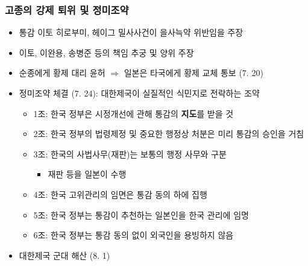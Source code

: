 \subsubsection*{고종의 강제 퇴위 및 정미조약}

\begin{itemize}
    \item 통감 이토 히로부미, 헤이그 밀사사건이 을사늑약 위반임을 주장
    \item 이토, 이완용, 송병준 등의 책임 추궁 및 양위 주장
    \item 순종에게 황제 대리 윤허 $\Rightarrow$ 일본은 타국에게 황제 교체 통보 (7. 20)
    \item 정미조약 체결 (7. 24): 대한제국이 실질적인 식민지로 전락하는 조약
    \begin{itemize}
        \item 1조: 한국 정부은 시정개선에 관해 통감의 \textbf{지도}를 받을 것
        \item 2조: 한국 정부의 법령제정 및 중요한 행정상 처분은 미리 통감의 승인을 거침
        \item 3조: 한국의 사법사무(재판)는 보통의 행정 사무와 구분
        \begin{itemize}
            \item 재판 등을 일본이 수행
        \end{itemize}
        \item 4조: 한국 고위관리의 임면은 통감 동의 하에 집행
        \item 5조: 한국 정부는 통감이 추천하는 일본인을 한국 관리에 임명
        \item 6조: 한국 정부는 통감 동의 없이 외국인을 용빙하지 않음
    \end{itemize}
    \item 대한제국 군대 해산 (8. 1)
\end{itemize}
